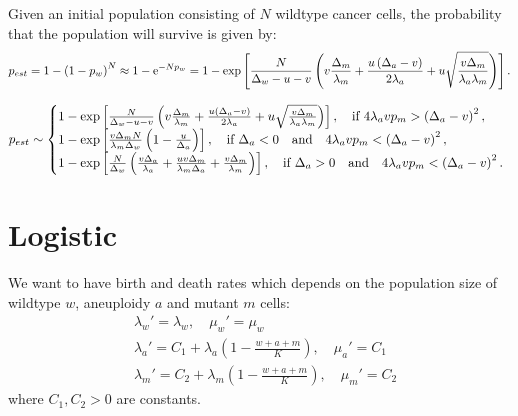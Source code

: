 \documentclass[11pt,a4paper]{article}
\newcommand{\e}{{\rm e}}
\begin{document}
Given an initial population consisting of $N$ wildtype cancer cells, the probability that the population will survive is given by: 
\begin{align*}
p_{est}=1-\left(1-p_w\right)^N\approx 1-\e^{-Np_w}=1-\exp\left[\frac{N}{\Delta_w-u-v}\left(v\frac{\Delta_m}{\lambda_m}+\frac{u\left(\Delta_a-v\right)}{2\lambda_a}+u\sqrt{\frac{v\Delta_m}{\lambda_a\lambda_m}}\right)\right].
\end{align*}

\begin{equation}
p_{est}\sim\left\{
  \begin{array}{@{}ll@{}}
  1-\exp\left[\frac{N}{\Delta_w-u-v}\left(v\frac{\Delta_m}{\lambda_m}+\frac{u\left(\Delta_a-v\right)}{2\lambda_a}+u\sqrt{\frac{v\Delta_m}{\lambda_a\lambda_m}}\right)\right],\quad\text{if }4\lambda_avp_m>\left(\Delta_a-v\right)^2,\\
   1-\exp\left[\frac{v\Delta_mN}{\lambda_m\Delta_w}\left(1-\frac{u}{\Delta_a}\right)\right],\quad\text{if }\Delta_a<0\quad\text{and}\quad4\lambda_avp_m<\left(\Delta_a-v\right)^2,\\
   1-\exp\left[\frac{N}{\Delta_w}\left(\frac{v\Delta_a}{\lambda_a}+\frac{uv\Delta_m}{\lambda_m\Delta_a}+\frac{v\Delta_m}{\lambda_m}\right)\right],\quad\text{if }\Delta_a>0\quad\text{and}\quad4\lambda_avp_m<\left(\Delta_a-v\right)^2.
  \end{array}\right.
\end{equation}
\section{Logistic}
We want to have birth and death rates which depends on the population size of wildtype $w$, aneuploidy $a$ and mutant $m$ cells:
\begin{align*}
&\lambda_w'=\lambda_w,\quad\mu_w'=\mu_w\\
&\lambda_a'=C_1+\lambda_a\left(1-\frac{w+a+m}{K}\right),\quad \mu_a'=C_1\\
&\lambda_m'=C_2+\lambda_m\left(1-\frac{w+a+m}{K}\right),\quad \mu_m'=C_2
\end{align*}
where $C_1, C_2>0$ are constants.
\end{document}
